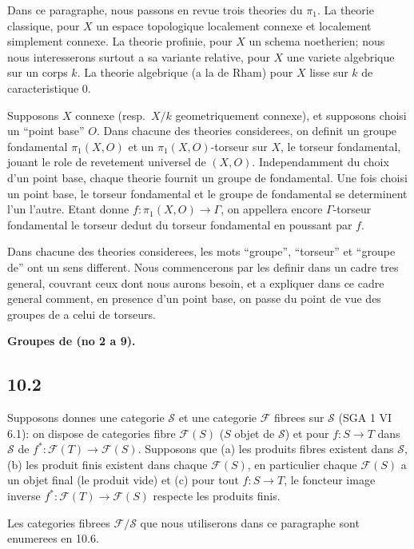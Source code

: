 \documentclass[12pt,a4paper]{article}
\theoremstyle{plain}
\theoremstyle{definition}
\theoremstyle{remark}
\begin{document}
Dans ce paragraphe, nous passons en revue trois theories du $\pi_1$. La theorie classique, pour $X$ un espace topologique localement connexe et localement simplement connexe. La theorie profinie, pour $X$ un schema noetherien; nous nous interesserons surtout a sa variante relative, pour $X$ une variete algebrique sur un corps $k$. La theorie algebrique (a la de Rham) pour $X$ lisse sur $k$ de caracteristique 0.

Supposons $X$ connexe (resp.~$X/k$ geometriquement connexe), et supposons choisi un ``point base'' $O$. Dans chacune des theories considerees, on definit un groupe fondamental $\pi_1(X, O)$ et un $\pi_1(X, O)$-torseur sur $X$, le torseur fondamental, jouant le role de revetement universel de $(X, O)$. Independamment du choix d'un point base, chaque theorie fournit un groupe de fondamental. Une fois choisi un point base, le torseur fondamental et le groupe de fondamental se determinent l'un l'autre. Etant donne $f: \pi_1(X,O) \to \Gamma$, on appellera encore $\Gamma$-torseur fondamental le torseur dedu\i t du torseur fondamental en poussant par $f$.

Dans chacune des theories considerees, les mots ``groupe'', ``torseur'' et ``groupe de'' ont un sens different. Nous commencerons par les definir dans un cadre tres general, couvrant ceux dont nous aurons besoin, et a expliquer dans ce cadre general comment, en presence d'un point base, on passe du point de vue des groupes de a celui de torseurs.

\textbf{Groupes de (no 2 a 9).}

\subsection*{10.2}

Supposons donnes une categorie $\mathcal{S}$ et une categorie $\mathcal{F}$ fibrees sur $\mathcal{S}$ (SGA 1 VI 6.1): on dispose de categories fibre $\mathcal{F}(S)$ ($S$ objet de $\mathcal{S}$) et pour $f: S \to T$ dans $\mathcal{S}$ de $f^*: \mathcal{F}(T) \to \mathcal{F}(S)$. Supposons que (a) les produits fibres existent dans $\mathcal{S}$, (b) les produit finis existent dans chaque $\mathcal{F}(S)$, en particulier chaque $\mathcal{F}(S)$ a un objet final (le produit vide) et (c) pour tout $f: S \to T$, le foncteur image inverse $f^*: \mathcal{F}(T) \to \mathcal{F}(S)$ respecte les produits finis.

Les categories fibrees $\mathcal{F}/\mathcal{S}$ que nous utiliserons dans ce paragraphe sont enumerees en 10.6.
\end{document}

